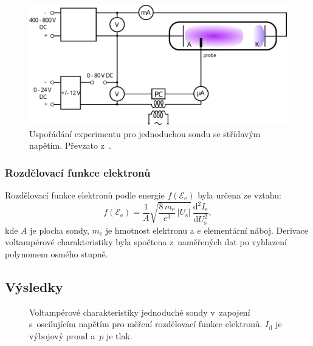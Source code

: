 \documentclass{protokol}
\newcommand\elemcharge{e}
\newcommand\masselec{m_\mathrm{e}}
\newcommand\pres{p}
\newcommand\idisch{I_\mathrm{d}}
\newcommand\ielec{I_\mathrm{e}}
\newcommand\uprobe{U_\mathrm{s}}
\newcommand\enelec{\mathcal E_\mathrm{e}}
\newcommand\eedf{f(\enelec)}
\begin{document}
\begin{figure}[hbp]
	\centering
	\includegraphics{diagram-eedf.png}
	\caption{Uspořádání experimentu pro jednoduchou sondu se střídavým napětím.
		Převzato z~\autocite{assignment-simpleprobe}.}
	\label{fig:diagram-eedf}
\end{figure}

\subsubsection{Rozdělovací funkce elektronů}
Rozdělovací funkce elektronů podle energie $\eedf$ byla určena ze vztahu:
\begin{equation}
	\label{eq:eedf}
	\eedf = \frac{1}{A} \sqrt{\frac{8\,\masselec}{\elemcharge^3}\,|\uprobe|}
		\,\frac{\mathrm d^2 \ielec}{\mathrm d\uprobe^2},
\end{equation}
kde $A$ je plocha sondy, $\masselec$ je hmotnost elektronu
a $\elemcharge$ elementární náboj.
Derivace voltampérové charakteristiky byla spočtena z~naměřených dat
po vyhlazení polynomem osmého stupně.

\subsection{Výsledky}
\label{sec:results-eedf}

\begin{figure}[p]
	\centering
	
	
	\par\smallskip
	
	
	\par\smallskip
	
	
	\caption{Voltampérové charakteristiky jednoduché sondy
		v~zapojení s~oscilujícím napětím
		pro měření rozdělovací funkce elektronů.
		$\idisch$ je výbojový proud a~$\pres$ je tlak.}
	\label{fig:simple2-vac}
\end{figure}
\end{document}
